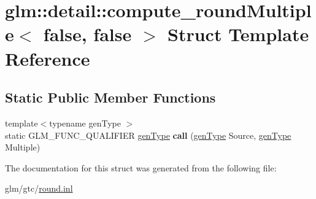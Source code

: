 \hypertarget{structglm_1_1detail_1_1compute__roundMultiple_3_01false_00_01false_01_4}{\section{glm\-:\-:detail\-:\-:compute\-\_\-round\-Multiple$<$ false, false $>$ Struct Template Reference}
\label{structglm_1_1detail_1_1compute__roundMultiple_3_01false_00_01false_01_4}
}
\subsection*{Static Public Member Functions}
\begin{DoxyCompactItemize}
\item 
\hypertarget{structglm_1_1detail_1_1compute__roundMultiple_3_01false_00_01false_01_4_a9242ffccd610779b8020ad382d47213a}{{\footnotesize template$<$typename gen\-Type $>$ }\\static G\-L\-M\-\_\-\-F\-U\-N\-C\-\_\-\-Q\-U\-A\-L\-I\-F\-I\-E\-R \hyperlink{structglm_1_1detail_1_1genType}{gen\-Type} {\bfseries call} (\hyperlink{structglm_1_1detail_1_1genType}{gen\-Type} Source, \hyperlink{structglm_1_1detail_1_1genType}{gen\-Type} Multiple)}\label{structglm_1_1detail_1_1compute__roundMultiple_3_01false_00_01false_01_4_a9242ffccd610779b8020ad382d47213a}

\end{DoxyCompactItemize}


The documentation for this struct was generated from the following file\-:\begin{DoxyCompactItemize}
\item 
glm/gtc/\hyperlink{round_8inl}{round.\-inl}\end{DoxyCompactItemize}
